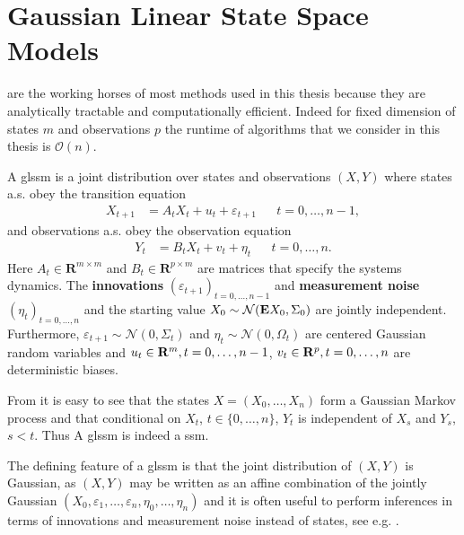 \section{Gaussian Linear State Space Models}
\label{sec:linear_gaussian_state_space_models}

 are the working horses of most methods used in this thesis because they are analytically tractable and computationally efficient. Indeed for fixed dimension of states $m$ and observations $p$ the runtime of algorithms that we consider in this thesis is $\mathcal O(n)$.

\begin{definition}
    \label{def:glssm}
    A \acrfull{glssm} is a joint distribution over states and observations $(X,Y)$ where states a.s. obey the transition equation
    \begin{align}
        \label{eq:glssm_states}
        X_{t + 1} & = A_{t}X_{t} + u_{t} + \varepsilon_{t + 1} &  & t = 0, \dots, n - 1,
    \end{align}
    and observations a.s. obey the observation equation
    \begin{align}
        \label{eq:glssm_observations}
        Y_{t} & = B_{t}X_{t} + v_{t} + \eta_{t} &  & t = 0, \dots, n.
    \end{align}
    Here $A_{t} \in \mathbf{R}^{m \times m}$ and $B_{t} \in \mathbf{R}^{p \times m}$ are matrices that specify the systems dynamics. The \textbf{innovations} $(\varepsilon_{t + 1})_{t = 0, \dots, n-1}$ and \textbf{measurement noise} $(\eta_{t})_{t = 0, \dots, n}$ and the  starting value $X_{0} \sim \mathcal N (\mathbf E X_{0}, \Sigma_{0})$ are jointly independent. Furthermore, $\varepsilon_{t+1} \sim \mathcal N(0, \Sigma_{t})$ and $\eta_{t}\sim \mathcal N(0, \Omega_{t})$ are centered Gaussian random variables and $u_{t} \in \mathbf R^{m}, t = 0, \dots, n - 1$, $v_{t} \in \mathbf R^{p}, t = 0, \dots, n$ are deterministic biases.
\end{definition}

\begin{remark}
    From  it is easy to see that the states $X = (X_{0}, \dots, X_{n})$ form a Gaussian Markov process and that conditional on $X_{t}$, $t \in \{0, \dots, n\}$, $Y_{t}$ is independent of $X_{s}$ and $Y_{s}$, $s < t$. Thus A \acrshort{glssm} is indeed a \acrshort{ssm}.
\end{remark}

The defining feature of a \gls{glssm} is that the joint distribution of $(X,Y)$ is Gaussian, as $(X,Y)$ may be written as an affine combination of the jointly Gaussian $(X_{0}, \varepsilon_{1}, \dots, \varepsilon_{n}, \eta_{0}, \dots, \eta_{n})$ and it is often useful to perform inferences in terms of innovations and measurement noise instead of states, see e.g. \citep[Section 4.5]{Durbin2012Time}.

